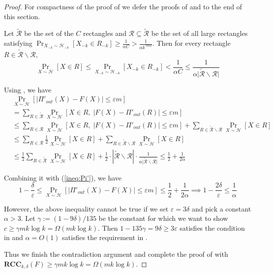 \documentclass{toc}
\newcommand{\follows}{\ensuremath{\sim}}
\newcommand{\error}{\ensuremath{\delta}}
\newcommand{\gap}{\ensuremath{\varepsilon}}
\newcommand{\bigo}[1]{\ensuremath{{{O} \left( {#1} \right)}}}
\newcommand{\bigomega}[1]{\ensuremath{{\Omega \left( {#1} \right)}}}
\newcommand{\eqdef}{\ensuremath{:=}}
\newcommand{\rcc}{\ensuremath{\mathbf{RCC}}}
\begin{document}
\begin{proof}
		For compactness of the proof of  we defer the proofs of  and   to the end of this section.

		Let $\widetilde{\mathcal{R}}$ be the set of the $C$ rectangles and $\mathcal{R}\subseteq\widetilde{\mathcal{R}}$ be the set of all large rectangles satisfying $\Pr_{X_{-k} \sim \mathcal{H}_{-k}}[X_{-k}\in R_{-k}]\ge \frac{1}{\alpha C}>\frac{1}{\alpha k^{\gamma mk}}$.
		Then for every rectangle $R\in \widetilde{\mathcal{R}}\backslash\mathcal{R}$, 
		\[\Pr_{X \sim \mathcal{H}}[X\in R]\le  \Pr_{X_{-k} \sim \mathcal{H}_{-k}}[X_{-k}\in R_{-k}]< \frac{1}{\alpha C} \le \frac{1}{\alpha \big|\widetilde{\mathcal{R}}\backslash\mathcal{R}
		\big|} \]

		Using , we have
		\begin{align*}
			&\Pr_{X\follows \mathcal{H}}\left[ \left| \Pi'_{out}(X) - F(X)\right| \le \gap m \right]	\\
			&=  \sum_{R\in \widetilde{\mathcal{R}}} %
			\Pr_{X\follows \mathcal{H}}\left[  X\in R,\; \left|F(X)-\Pi'_{out}(R)\right|\le \gap m \right] \\
			&\le  \sum_{R\in {\mathcal{R}}} %
			\Pr_{X\follows \mathcal{H}}\left[  X\in R,\; \left|F(X)-\Pi'_{out}(R)\right|\le \gap m \right] 
			+ \sum_{R\in \widetilde{\mathcal{R}}\backslash\mathcal{R}} \Pr_{X\follows \mathcal{H}}[X\in R] \\
			&\le \sum_{R\in {\mathcal{R}}}  \frac{1}{2} \Pr_{X\follows \mathcal{H}}\left[ X\in R\right]
			+ \sum_{R\in \widetilde{\mathcal{R}}\backslash\mathcal{R}} \Pr_{X\follows \mathcal{H}}[X\in R] \\
			&\le \frac{1}{2} \sum_{R\in \widetilde{\mathcal{R}}} \Pr_{X\follows \mathcal{H}}[X\in R] +\frac{1}{2} \cdot \left| \widetilde{\mathcal{R}}\backslash\mathcal{R}\right|\cdot \frac{1}{\alpha \big|\widetilde{\mathcal{R}}\backslash\mathcal{R}
		\big|}
			\le \frac{1}{2}+\frac{1}{2\alpha}
		\end{align*}	

Combining it with (\ref{ineq:Pi'}), %
%
%
we have 
	\[1-\frac{\error}{\gap} \le \Pr_{X\follows \mathcal{H}}\left[ \left| \Pi'_{out}(X) - F(X)\right| \le \gap m \right] \le \frac{1}{2}+\frac{1}{2\alpha}  
	\implies 1-\frac{2\error}{\gap}\le \frac{1}{\alpha}\]
	
	However, the above inequality cannot be true if we set $\gap =3\error$ and pick a constant $\alpha>3$.
	Let $\gamma\eqdef (1-9\error)/135$ be the constant for which we want to show $c\ge \gamma mk\log k= \bigomega{m k \log k}$.
	Then $1-135\gamma = 9\error \ge 3\gap$ satisfies the condition in  and $\alpha=\bigo{1}$ satisfies the requirement in .



	Thus we finish the contradiction argument and complete the proof of  with $\rcc_{k,\error}(F)\ge  \gamma mk\log k =\bigomega{m k\log k}$. 
	\end{proof}
\end{document}
